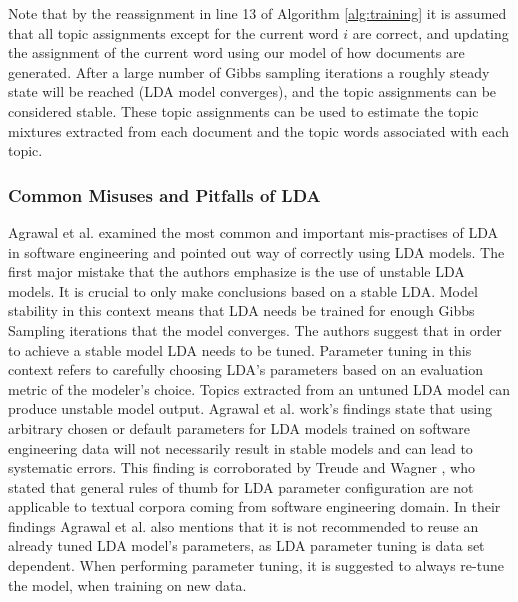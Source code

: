         Note that by the reassignment in line 13 of Algorithm \ref{alg:training} it is assumed that all topic assignments except for the current word $i$ are correct, and updating the assignment of the current word using our model of how documents are generated. After a large number of Gibbs sampling iterations a roughly steady state will be reached (LDA model converges), and the topic assignments can be considered stable. These topic assignments can be used to estimate the topic mixtures extracted from each document and the topic words associated with each topic.
        
        
        \subsubsection{Common Misuses and Pitfalls of LDA}
            Agrawal et al. \cite{agrawal2018wrong} examined the most common and important mis-practises of LDA in software engineering and pointed out way of correctly using LDA models. The first major mistake that the authors emphasize is the use of unstable LDA models. It is crucial to only make conclusions based on a stable LDA. Model stability in this context means that LDA needs be trained for enough Gibbs Sampling iterations that the model converges. The authors suggest that in order to achieve a stable model LDA needs to be tuned. Parameter tuning in this context refers to carefully choosing LDA's parameters based on an evaluation metric of the modeler's choice. Topics extracted from an untuned LDA model can produce unstable model output. Agrawal et al. \cite{agrawal2018wrong} work's findings state that using arbitrary chosen or default parameters for LDA models trained on software engineering data will not necessarily result in stable models and can lead to systematic errors. This finding is corroborated by Treude and Wagner \cite{treude2019predicting}, who stated that general rules of thumb for LDA parameter configuration are not applicable to textual corpora coming from software engineering domain. In their findings Agrawal et al. \cite{agrawal2018wrong} also mentions that it is not recommended to reuse an already tuned LDA model's parameters, as LDA parameter tuning is data set dependent. When performing parameter tuning, it is suggested to always re-tune the model, when training on new data.
            
